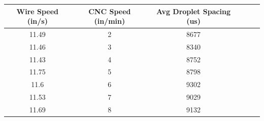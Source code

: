\documentclass[12pt]{article}
\begin{document}
\clearpage

\begin{center}

\begin{tabular}{ |c|c|c|c|c|c| }


  \hline
  \textbf{Wire Speed (in/s)} & \textbf{CNC Speed (in/min)} & \textbf{Avg Droplet Spacing (us)} \\ \hline

11.49 &	2 &	8677 \\ \hline
11.46 &	3 &	8340 \\ \hline
11.43 &	4 &	8752 \\ \hline
11.75 &	5 &	8798 \\ \hline
11.6 &	6 &	9302 \\ \hline
11.53 &	7 &	9029 \\ \hline
11.69 &	8 &	9132 \\ \hline 




  
\end{tabular}


\end{center}

\clearpage
\end{document}
